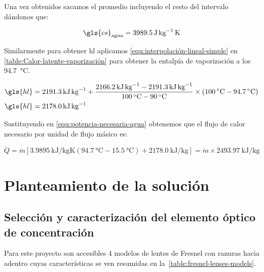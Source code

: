 			Una vez obtenidos sacamos el promedio incluyendo el resto del intervalo dándonos que:
			
			\begin{equation*}
				\gls{cs}_{\text{agua}} = \qty{3989.5}{\joule\per\kg\kelvin}
			\end{equation*}
			
			Similarmente para obtener \gls{hl} aplicamos \eqref{equ:interpolación-lineal-simple} en \cref{table:Calor-latente-vaporización} para obtener la entalpía de vaporización a los \qty{94.7}{\degreeCelsius}.
			
			\begin{align*}
				\gls{hl} &= \qty{2191.3}{\kilo\joule\per\kg} + \dfrac{\qty{2166.2}{\kilo\joule\per\kg} - \qty{2191.3}{\kilo\joule\per\kg}}{\qty{100}{\degreeCelsius}-\qty{90}{\degreeCelsius}} \times (\qty{100}{\degreeCelsius} - \qty{94.7}{\degreeCelsius})\\
				\gls{hl} &= \qty{2178.0}{\kilo\joule\per\kg}
			\end{align*}
			
			Sustituyendo en \eqref{equ:potencia-necesaria-agua} obtenemos que el flujo de calor necesario por unidad de flujo másico es:
			
			\begin{equation}\label{equ:potencia-necesaria-sistema}
				\dot{Q} = \dot{m}\left[\qty{3.9895}{\kilo\joule\per\kg\kelvin} \left(\qty{94.7}{\degreeCelsius}-\qty{15.5}{\degreeCelsius}\right) + \qty{2178.0}{\kilo\joule\per\kg}\right] = \dot{m} \times \qty{2493.97}{\kilo\joule\per\kg}
			\end{equation}
			
			
	\section{Planteamiento de la solución}
		\subsection{Selección y caracterización del elemento óptico de concentración}
			
			Para este proyecto son accesibles 4 modelos de lentes de Fresnel con ranuras hacia adentro cuyas características se ven resumidas en la~\cref{table:fresnel-lenses-models}.
			
